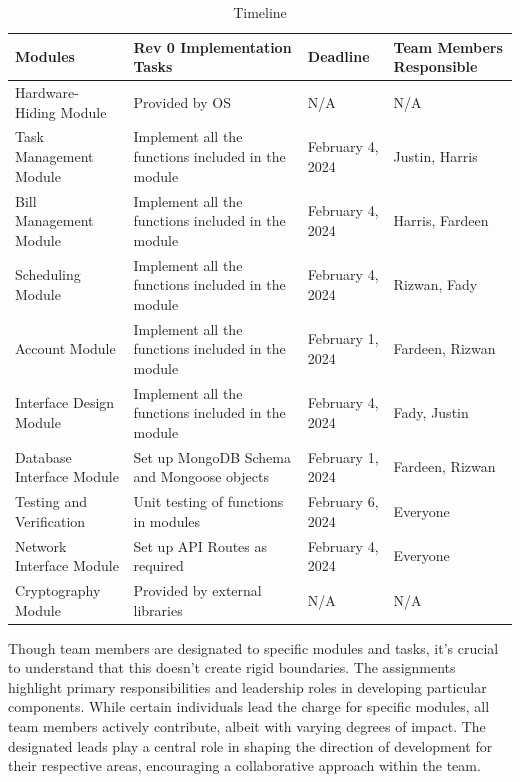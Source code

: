 \documentclass[12pt, titlepage]{article}
\begin{document}
\begin{table}[H]
    \centering
    \begin{tabular}{|>{\raggedright}p{}|p{}|p{}|p{}|}
    \hline
    \textbf{Modules} & \textbf{Rev 0 Implementation Tasks} & \textbf{Deadline} & \textbf{Team Members Responsible}\\
    \hline
     Hardware-Hiding Module & Provided by OS & N/A & N/A\\
    \hline
     Task Management Module & Implement all the functions included in the module & February 4, 2024 & Justin, Harris\\
    \hline
    Bill Management Module & Implement all the functions included in the module & February 4, 2024 & Harris, Fardeen\\
    \hline
    Scheduling Module & Implement all the functions included in the module & February 4, 2024 & Rizwan, Fady\\
    \hline
    Account Module & Implement all the functions included in the module & February 1, 2024 & Fardeen, Rizwan\\
    \hline
    Interface Design Module & Implement all the functions included in the module & February 4, 2024 & Fady, Justin\\
    \hline
    Database Interface  Module & Set up MongoDB Schema and Mongoose objects & February 1, 2024 & Fardeen, Rizwan\\
    \hline
    Testing and Verification & Unit testing of functions in modules & February 6, 2024 & Everyone\\
    \hline
     Network Interface Module & Set up API Routes as required & February 4, 2024 & Everyone\\
    \hline
     Cryptography Module & Provided by external libraries & N/A & N/A\\
    \hline
    \end{tabular}
    \caption{Timeline}
    \label{tab:timeline}
\end{table}

Though team members are designated to specific modules and tasks, it's crucial to understand that this doesn't create rigid boundaries. The assignments highlight primary responsibilities and leadership roles in developing particular components. While certain individuals lead the charge for specific modules, all team members actively contribute, albeit with varying degrees of impact. The designated leads play a central role in shaping the direction of development for their respective areas, encouraging a collaborative approach within the team.
\end{document}
